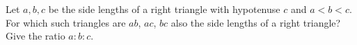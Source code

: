 Let $a,b,c$ be the side lengths of a right triangle with hypotenuse $c$ and $a<b<c$. For which such triangles are $ab$, $ac$, $bc$ also the side lengths of a right triangle? Give the ratio $a:b:c$.
